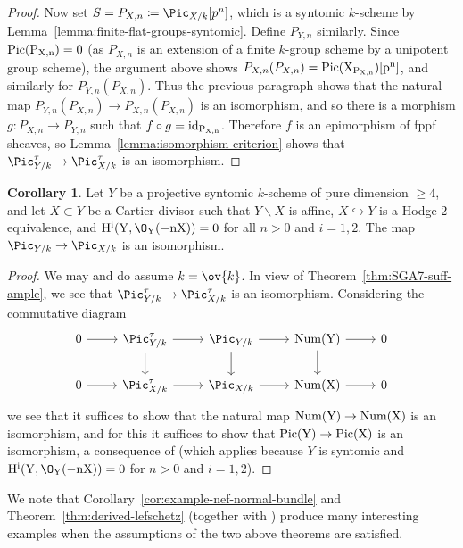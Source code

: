 \documentclass[11pt,reqno]{amsart}
\numberwithin{equation}{section}
\theoremstyle{definition}
\newtheorem{cor}[thm]{Corollary}
\begin{document}
\begin{proof}
Now set $S = P_{X,n} \coloneqq \Pic_{X/k}[p^n]$, which is a syntomic $k$-scheme by Lemma~\ref{lemma:finite-flat-groups-syntomic}. Define $P_{Y,n}$ similarly. Since $\rm{Pic}(P_{X,n}) = 0$ (as $P_{X, n}$ is an extension of a finite $k$-group scheme by a unipotent group scheme), the argument above shows $P_{X,n}(P_{X,n}) = \rm{Pic}(X_{P_{X,n}})[p^n]$, and similarly for $P_{Y,n}(P_{X,n})$. Thus the previous paragraph shows that the natural map $P_{Y,n}(P_{X,n}) \to P_{X,n}(P_{X,n})$ is an isomorphism, and so there is a morphism $g\colon P_{X,n} \to P_{Y,n}$ such that $f \circ g = \rm{id}_{P_{X,n}}$. Therefore $f$ is an epimorphism of fppf sheaves, so Lemma~\ref{lemma:isomorphism-criterion} shows that $\Pic^\tau_{Y/k} \to \Pic^\tau_{X/k}$ is an isomorphism.
\end{proof}

\begin{cor}\label{cor:Pic-scheme-iso}
Let $Y$ be a projective syntomic $k$-scheme of pure dimension $\geq 4$, and let $X \subset Y$ be a Cartier divisor such that $Y\smallsetminus X$ is affine, $X \hookrightarrow Y$ is a Hodge $2$-equivalence, and $\rm{H}^i(Y, \O_Y(-nX)) = 0$ for all $n > 0$ and $i = 1, 2$. The map $\Pic_{Y/k} \to \Pic_{X/k}$ is an isomorphism.
\end{cor}

\begin{proof}
We may and do assume $k = \ov{k}$. In view of Theorem~\ref{thm:SGA7-suff-ample}, we see that $\Pic^\tau_{Y/k} \to \Pic^\tau_{X/k}$ is an isomorphism. Considering the commutative diagram
\[
\begin{tikzcd}
0 \arrow[r]
    &\Pic^\tau_{Y/k} \arrow[r] \arrow[d]
    &\Pic_{Y/k} \arrow[r] \arrow[d]
    &\rm{Num}(Y) \arrow[r] \arrow[d]
    &0 \\
0 \arrow[r]
    &\Pic^\tau_{X/k} \arrow[r]
    &\Pic_{X/k} \arrow[r]
    &\rm{Num}(X) \arrow[r]
    &0
\end{tikzcd}
\]
we see that it suffices to show that the natural map $\rm{Num}(Y) \to \rm{Num}(X)$ is an isomorphism, and for this it suffices to show that $\rm{Pic}(Y) \to \rm{Pic}(X)$ is an isomorphism, a consequence of \cite[Exp.\ XII, Cor.\ 3.6]{SGA2} (which applies because $Y$ is syntomic and $\rm{H}^i(Y, \O_Y(-nX))=0$ for $n>0$ and $i=1,2$).
\end{proof}

We note that Corollary~\ref{cor:example-nef-normal-bundle} and Theorem~\ref{thm:derived-lefschetz} (together with \cite[Cor.~2.8]{Deligne-Illusie}) produce many interesting examples when the assumptions of the two above theorems are satisfied. \smallskip
\end{document}
